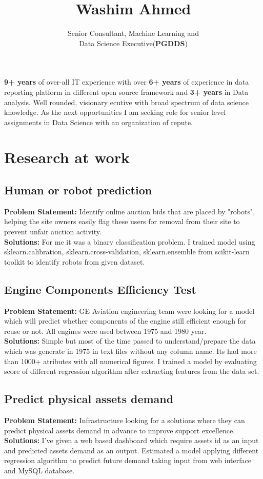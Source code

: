 \documentclass{article}
\title{\textbf{Washim Ahmed}}
\author{Senior Consultant, Machine Learning and \\Data Science Executive(\textbf{PGDDS})}
\date{}
\begin{document}

\maketitle
\thispagestyle{empty}
\justify

\textbf{9+ years} of over-all IT experience with over \textbf{6+ years} of experience in data reporting platform in different open source framework and \textbf{3+ years} in Data analysis. Well rounded, visionary ecutive with broad spectrum of data science knowledge. As the next opportunities I am seeking role for senior level assignments in Data Science with an organization of repute.\\

\section{Research at work}

\subsection{Human or robot prediction}
\textbf{Problem Statement:} Identify online auction bids that are placed by "robots", helping the site owners easily flag these users for removal from their site to prevent unfair auction activity.\\
\textbf{Solutions:} For me it was a binary classification problem. I trained model using sklearn.calibration, sklearn.cross-validation, sklearn.ensemble from scikit-learn toolkit to identify robots from given dataset.

\subsection{Engine Components Efficiency Test}
\textbf{Problem Statement:} GE Aviation engineering team were looking for a model which will predict whether components of the engine still efficient enough for reuse or not. All engines were used between 1975 and 1980 year.\\
\textbf{Solutions:} Simple but most of the time passed to understand/prepare the data which was generate in 1975 in text files without any column name. Its had more than 1000+ atributes with all numerical figures. I trained a model by evaluating score of different regression algorithm after extracting features from the data set.

\subsection{Predict physical assets demand}
\textbf{Problem Statement:} Infrastructure looking for a solutions where they can predict physical assets demand in advance to improve support excellence.\\
\textbf{Solutions:} I've given a web based dashboard which require assets id as an input and predicted assets demand as an output. Estimated a model applying different regression algorithm to predict future demand taking input from web interface and MySQL database.
\end{document}
